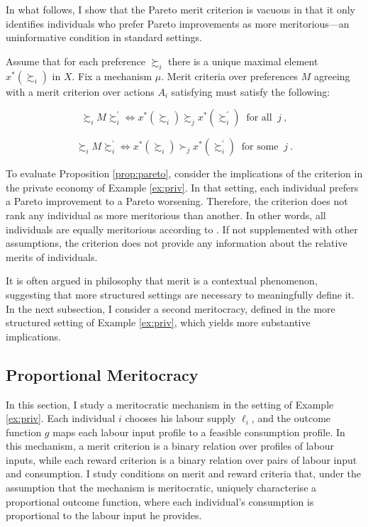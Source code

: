In what follows, I show that the Pareto merit criterion is vacuous in that it only identifies individuals who prefer Pareto improvements as more meritorious—an uninformative condition in standard settings.

\begin{prop}\label{prop:pareto}
	Assume that for each preference \( \succsim_i \) there is a unique maximal element \( x^{*} (\succsim_i) \) in \( X \). Fix a mechanism \( \mu \). Merit criteria over preferences \( M \) agreeing with a merit criterion over actions \( A_i \) satisfying  must satisfy the following:

	\[
		\succsim_i M \succsim_i^{\prime} \iff x^{*} (\succsim_i) \succsim_j x^{*} (\succsim_i^{\prime})  \: \text{ for all } \: j \: ,
	\]

	\[
		\succsim_i M \succsim_i^{\prime} \iff x^{*} (\succsim_i) \succ_j x^{*} (\succsim_i^{\prime})  \: \text{ for some } \: j \: .
	\]
\end{prop}

To evaluate Proposition \ref{prop:pareto}, consider the implications of the  criterion in the private economy of Example \ref{ex:priv}. In that setting, each individual prefers a Pareto improvement to a Pareto worsening. Therefore, the  criterion does not rank any individual as more meritorious than another. In other words, all individuals are equally meritorious according to . If not supplemented with other assumptions, the  criterion does not provide any information about the relative merits of individuals.

It is often argued in philosophy that merit is a contextual phenomenon, suggesting that more structured settings are necessary to meaningfully define it. In the next subsection, I consider a second meritocracy, defined in the more structured setting of Example \ref{ex:priv}, which yields more substantive implications.

\subsection{Proportional Meritocracy}\label{subsec:prop}

In this section, I study a meritocratic mechanism in the setting of Example \ref{ex:priv}. Each individual \( i \) chooses his labour supply \( \ell_i \), and the outcome function \( g \) maps each labour input profile to a feasible consumption profile. In this mechanism, a merit criterion is a binary relation over profiles of labour inputs, while each reward criterion is a binary relation over pairs of labour input and consumption. I study conditions on merit and reward criteria that, under the assumption that the mechanism is meritocratic, uniquely characterise a proportional outcome function, where each individual's consumption is proportional to the labour input he provides.

